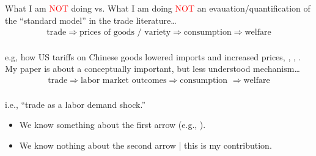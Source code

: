 \documentclass[9pt,pdftex,aspectratio=1610]{beamer}
\theoremstyle{definition}
\begin{document}
\begin{frame}[t]{What I am \textcolor{red}{NOT} doing vs. What I am doing}
\textcolor{red}{NOT} an evauation/quantification of the ``standard model'' in the trade literature\ldots
\begin{eqnarray*}
\mbox{trade} \Rightarrow \mbox{prices of goods / variety} \Rightarrow \mbox{consumption} \Rightarrow \mbox{welfare}
\end{eqnarray*}\\
\medskip
e.g, how US tariffs on Chinese goods lowered imports and increased prices, {\footnotesize \citet*{fajgelbaum2019return}, \citet*{amiti2019impact}, \citet*{neiman_NBERw26396}}.\\
\bigskip
\bigskip
My paper is about a conceptually important, but less understood mechanism\ldots
\begin{eqnarray*}
\mbox{trade} \Rightarrow \mbox{labor market outcomes} \Rightarrow \mbox{consumption } \Rightarrow \mbox{welfare}
\end{eqnarray*}\\
\medskip
i.e., ``trade as a labor demand shock.''
\begin{itemize}
\smallskip
\item We know something about the first arrow (e.g., {\footnotesize\citet*{david2013china}}).
\smallskip
\item We know nothing about the second arrow | this is my contribution.
\end{itemize}
\end{frame}

\end{document}
